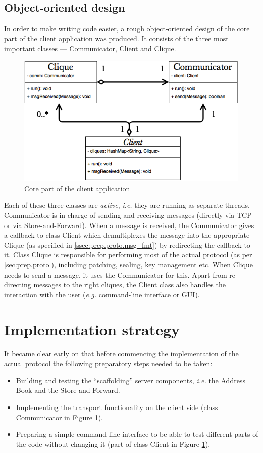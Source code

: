 \documentclass[a4paper, twoside, 12pt]{report}
\begin{document}
\subsection{Object-oriented design}
In order to make writing code easier, a rough object-oriented design of the core part of the client application was produced. It consists of the three most important classes --- Communicator, Client and Clique.

\begin{figure}[H]
    \centering
    \includegraphics[width = 0.7 \linewidth]{pics/core_uml.png}
    \caption{\label{fig:core_uml} Core part of the client application}
\end{figure}

Each of these three classes are \emph{active}, \textit{i.e.} they are running as separate threads. Communicator is in charge of sending and receiving messages (directly via TCP or via Store-and-Forward). When a message is received, the Communicator gives a callback to class Client which demultiplexes the message into the appropriate Clique (as specified in \cref{ssec:prep.proto.msg_fmt}) by redirecting the callback to it. Class Clique is responsible for performing most of the actual protocol (as per \cref{sec:prep.proto}), including patching, sealing, key management etc. When Clique needs to send a message, it uses the Communicator for this. Apart from re-directing messages to the right cliques, the Client class also handles the interaction with the user (\textit{e.g.} command-line interface or GUI).

\section{Implementation strategy}
\label{sec:prep.impl_strat}
It became clear early on that before commencing the implementation of the actual protocol the following preparatory steps needed to be taken:
\begin{itemize}
    \item Building and testing the ``scaffolding'' server components, \textit{i.e.} the Address Book and the Store-and-Forward.
    \item Implementing the transport functionality on the client side (class Communicator in Figure \ref{fig:core_uml}).
    \item Preparing a simple command-line interface to be able to test different parts of the code without changing it (part of class Client in Figure \ref{fig:core_uml}).
\end{itemize}
\end{document}
